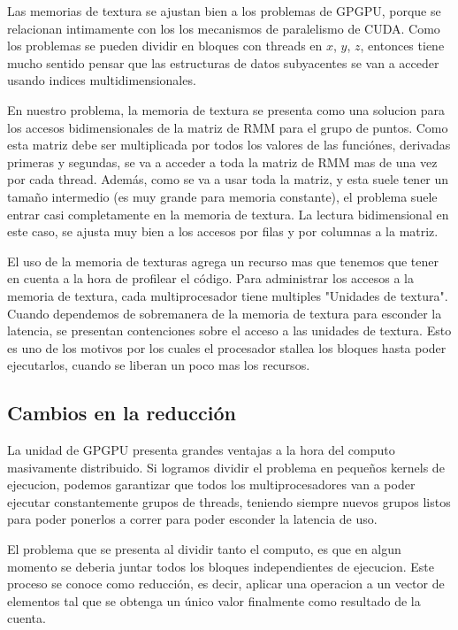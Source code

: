 Las memorias de textura se ajustan bien a los problemas de GPGPU, porque se relacionan
intimamente con los los mecanismos de paralelismo de CUDA. Como los problemas se pueden
dividir en bloques con threads en $x$, $y$, $z$, entonces tiene mucho sentido pensar
que las estructuras de datos subyacentes se van a acceder usando indices multidimensionales.

En nuestro problema, la memoria de textura se presenta como una solucion para
los accesos bidimensionales de la matriz de RMM para el grupo de puntos.
Como esta matriz debe ser multiplicada por todos los valores de las funci\'ones,
derivadas primeras y segundas, se va a acceder a toda la matriz de RMM mas de
una vez por cada thread. Adem\'as, como se va a usar toda la matriz, y esta suele
tener un tamaño intermedio (es muy grande para memoria constante), el problema
suele entrar casi completamente en la memoria de textura.
La lectura bidimensional en este caso, se ajusta muy bien a los accesos por filas
y por columnas a la matriz.

El uso de la memoria de texturas agrega un recurso mas que tenemos que tener en
cuenta a la hora de profilear el c\'odigo. Para administrar los accesos a
la memoria de textura, cada multiprocesador tiene multiples "Unidades de textura".
Cuando dependemos de sobremanera de la memoria de textura para esconder la latencia,
se presentan contenciones sobre el acceso a las unidades de textura. Esto es
uno de los motivos por los cuales el procesador stallea los bloques hasta poder
ejecutarlos, cuando se liberan un poco mas los recursos.


\subsection{Cambios en la reducci\'on}

La unidad de GPGPU presenta grandes ventajas a la hora del computo masivamente distribuido.
Si logramos dividir el problema en pequeños kernels de ejecucion, podemos garantizar que
todos los multiprocesadores van a poder ejecutar constantemente grupos de threads, teniendo
siempre nuevos grupos listos para poder ponerlos a correr para poder esconder la latencia de uso.

El problema que se presenta al dividir tanto el computo, es que en algun momento se deberia juntar
todos los bloques independientes de ejecucion. Este proceso se conoce como reducci\'on, es decir,
aplicar una operacion a un vector de elementos tal que se obtenga un \'unico valor finalmente
como resultado de la cuenta.

